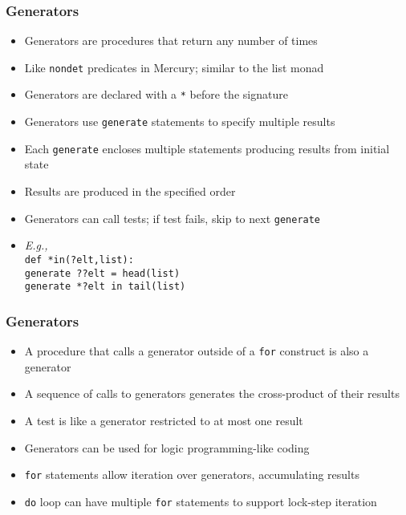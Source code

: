 \documentclass[12pt]{beamer}
\begin{document}
\begin{frame}[fragile]
\frametitle{Generators}
\begin{itemize}
\item Generators are procedures that return any number of times
\item Like \texttt{nondet} predicates in Mercury; similar to the list monad
\item Generators are declared with a \texttt{*} before the signature
\item Generators use \texttt{generate} statements to specify
  multiple results
\item Each \texttt{generate} encloses multiple statements producing
  results from initial state
\item Results are produced in the specified order
\item Generators can call tests; if test fails, skip to next \texttt{generate}
\item \emph{E.g.,} \\
  \hspace*{2em}\texttt{def *in(?elt,list):} \\
  \hspace*{4em}\texttt{generate ??elt = head(list)} \\
  \hspace*{4em}\texttt{generate *?elt in tail(list)} \\

\end{itemize}
\end{frame}


\begin{frame}[fragile]
\frametitle{Generators}
\begin{itemize}
\item A procedure that calls a generator outside of a \texttt{for}
  construct is also a generator
\item A sequence of calls to generators generates the cross-product of
  their results
\item A test is like a generator restricted to at most one result
\item Generators can be used for logic programming-like coding
\item \texttt{for} statements allow iteration over generators,
  accumulating results
\item \texttt{do} loop can have multiple \texttt{for} statements to
  support lock-step iteration
\end{itemize}
\end{frame}
\end{document}
